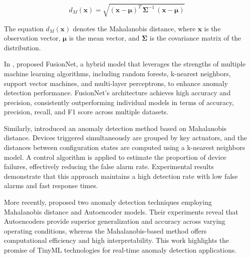 \begin{ZhChapter}
    \begin{equation}
        d_M(\mathbf{x}) = \sqrt{(\mathbf{x} - \boldsymbol{\mu})^T \, \boldsymbol{\Sigma}^{-1} \, (\mathbf{x} - \boldsymbol{\mu})}
    \end{equation}

    The equation $d_M(\mathbf{x})$ denotes the Mahalanobis distance, where $\mathbf{x}$ is the observation vector, $\boldsymbol{\mu}$ is the mean vector, and $\boldsymbol{\Sigma}$ is the covariance matrix of the distribution.




    In \cite{10415174}, \citeauthor{10415174} proposed FusionNet, a hybrid model that leverages the strengths of multiple machine learning algorithms, including random forests, k-nearest neighbors, support vector machines, and multi-layer perceptrons, to enhance anomaly detection performance. FusionNet's architecture achieves high accuracy and precision, consistently outperforming individual models in terms of accuracy, precision, recall, and F1 score across multiple datasets.

    Similarly, \citeauthor{10622234} \cite{10622234} introduced an anomaly detection method based on Mahalanobis distance. Devices triggered simultaneously are grouped by key actuators, and the distances between configuration states are computed using a k-nearest neighbors model. A control algorithm is applied to estimate the proportion of device failures, effectively reducing the false alarm rate. Experimental results demonstrate that this approach maintains a high detection rate with low false alarms and fast response times.

    More recently, \citeauthor{pillai2024using} \cite{pillai2024using} proposed two anomaly detection techniques employing Mahalanobis distance and Autoencoder models. Their experiments reveal that Autoencoders provide superior generalization and accuracy across varying operating conditions, whereas the Mahalanobis-based method offers computational efficiency and high interpretability. This work highlights the promise of TinyML technologies for real-time anomaly detection applications.






\end{ZhChapter}